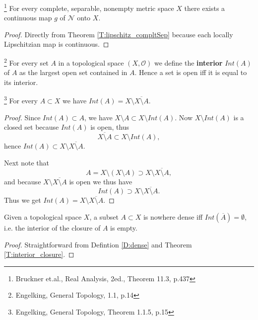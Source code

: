 \begin{corollary} 
\footnote{Bruckner et.al., Real Analysis, 2ed., Theorem 11.3, p.437}
For every complete, separable, nonempty metric space $X$ there exists a 
continuous map $g$ of $\mathcal{N}$ onto $X$.
\end{corollary}
\begin{proof}
Directly from Theorem \ref{T:lipschitz_compltSep} because each locally
Lipschitzian map is continuous.
\end{proof}


\begin{definition}
\footnote{Engelking, General Topology, 1.1, p.14}
For every set $A$ in a topological space $(X,\mathcal{O})$ we define the 
\textbf{interior} 
$Int(A)$ of $A$ as the largest open set contained in $A$. 
Hence a set is open iff it is equal to its interior.
\end{definition}

\begin{theorem} \label{T:interior_closure}
\footnote{Engelking, General Topology, Theorem 1.1.5, p.15}
For every $A\subset X$ we have $Int(A)= X\setminus \overline{X\setminus A}$.
\end{theorem}
\begin{proof}
Since $Int(A)\subset A$, we have $X\setminus A\subset X\setminus Int(A)$. Now
$X\setminus Int(A)$ is a closed set because $Int(A)$ is open, thus
\[
	\overline{X\setminus A} \subset X\setminus Int(A),
\]
hence $Int(A)\subset X\setminus \overline{X\setminus A}$.

Next note that 
\[
	A=X\setminus (X\setminus A) \supset X\setminus \overline{X\setminus A},
\]
and because $X\setminus \overline{X\setminus A}$ is open we thus have
\[
	Int(A)\supset X\setminus \overline{X\setminus A}.
\]
Thus we get $Int(A)= X\setminus \overline{X\setminus A}$.
\end{proof}

\begin{proposition} \label{P:nodense}
Given a topological space $X$, a subset $A\subset X$ is nowhere dense iff
$Int(\overline{A})=\emptyset$, i.e. the interior of the closure of $A$ is 
empty. 
\end{proposition}
\begin{proof}
Straightforward from Defintion \ref{D:dense} and Theorem \ref{T:interior_closure}.
\end{proof}

